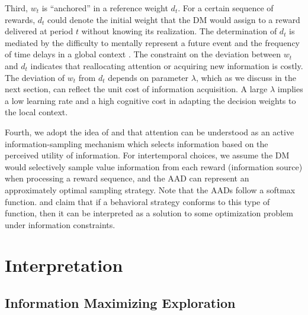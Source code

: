 \documentclass[
  12pt,
]{article}
\begin{document}
Third, \(w_t\) is ``anchored'' in a reference weight \(d_t\). For a
certain sequence of rewards, \(d_t\) could denote the initial weight
that the DM would assign to a reward delivered at period \(t\) without
knowing its realization. The determination of \(d_t\) is mediated by the
difficulty to mentally represent a future event
\citep{trope2003temporal} and the frequency of time delays in a global
context \citep{stewart2006decision}. The constraint on the deviation
between \(w_t\) and \(d_t\) indicates that reallocating attention or
acquiring new information is costly. The deviation of \(w_t\) from
\(d_t\) depends on parameter \(\lambda\), which as we discuss in the
next section, can reflect the unit cost of information acquisition. A
large \(\lambda\) implies a low learning rate and a high cognitive cost
in adapting the decision weights to the local context.

Fourth, we adopt the idea of \citet{gottlieb2012attention} and
\citet{gottlieb2013information} that attention can be understood as an
active information-sampling mechanism which selects information based on
the perceived utility of information. For intertemporal choices, we
assume the DM would selectively sample value information from each
reward (information source) when processing a reward sequence, and the
AAD can represent an approximately optimal sampling strategy. Note that
the AADs follow a softmax function. \citet{matvejka2015rational} and
\citet{mackowiak2023rational} claim that if a behavioral strategy
conforms to this type of function, then it can be interpreted as a
solution to some optimization problem under information constraints.

\hypertarget{interpretation}{%
\section{Interpretation}\label{interpretation}}

\hypertarget{information-maximizing-exploration}{%
\subsection{\texorpdfstring{Information Maximizing Exploration
\label{info_exploration}}{Information Maximizing Exploration }}\label{information-maximizing-exploration}}
\end{document}
